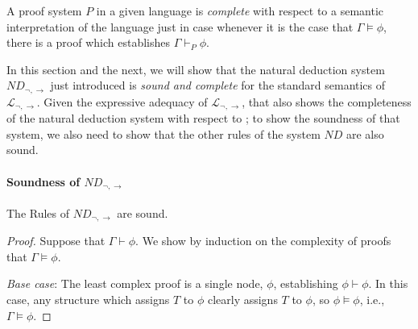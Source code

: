 {A proof system $P$ in a given language is \emph{complete} with respect to a semantic interpretation of the language just in case whenever it is the case that $\Gamma \vDash \phi$, there is a proof which establishes $\Gamma \vdash_{P} \phi$.

In this section and the next, we will show that the natural deduction system $ND_{\neg,\to}$ just introduced is \emph{sound and complete} for the standard semantics of $\mathcal{L}_{\neg,\to}$. Given the expressive adequacy of $\mathcal{L}_{\neg,\to}$, that also shows the completeness of the natural deduction system with respect to \lone; to show the soundness of that system, we also need to show that the other rules of the system $ND$ are also sound.


\paragraph{Soundness of $ND_{\neg,\to}$}

\begin{theorem} The Rules of $ND_{\neg,\to}$ are sound.
\begin{proof} Suppose that $\Gamma \vdash \phi$. We show by induction on the complexity of proofs that $\Gamma \vDash \phi$.

\emph{Base case}: The least complex proof is a single node, $\phi$, establishing $\phi \vdash \phi$. In this case, any structure which assigns $T$ to $\phi$ clearly assigns $T$ to $\phi$, so $\phi\vDash\phi$, i.e., $\Gamma\vDash\phi$.


\end{proof}
\end{theorem}}
